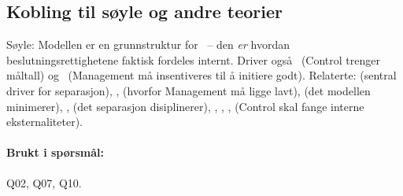 \subsection*{Kobling til søyle og andre teorier}
Søyle: Modellen er en grunnstruktur for \SOne\ -- den \emph{er} hvordan beslutningsrettighetene faktisk fordeles internt. Driver også \STwo\ (Control trenger måltall) og \SThree\ (Management må insentiveres til å initiere godt). Relaterte:  (sentral driver for separasjon), ,  (hvorfor Management må ligge lavt),  (det modellen minimerer), ,  (det separasjon disiplinerer), , , ,  (Control skal fange interne eksternaliteter).

\paragraph{Brukt i spørsmål:} Q02, Q07, Q10.
